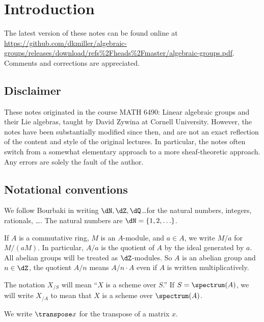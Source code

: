 
\section{Introduction}





The latest version of these notes can be found online at 
\url{https://github.com/dkmiller/algebraic-groups/releases/download/refs%2Fheads%2Fmaster/algebraic-groups.pdf}.
Comments and corrections are appreciated. 





\subsection{Disclaimer}

These notes originated in the course MATH 6490: Linear algebraic groups and 
their Lie algebras, taught by David Zywina at Cornell University. However, the 
notes have been substantially modified since then, and are not an exact 
reflection of the content and style of the original lectures. In particular, 
the notes often switch from a somewhat elementary approach to a more 
sheaf-theoretic approach. Any errors are solely the fault of the author. 





\subsection{Notational conventions}

We follow Bourbaki in writing $\dN,\dZ,\dQ$\ldots for the natural numbers, 
integers, rationals, \ldots. The natural numbers are $\dN=\{1,2,\ldots\}$. 

If $A$ is a commutative ring, $M$ is an $A$-module, and $a\in A$, 
we write $M/a$ for $M/(a M)$. In particular, $A/a$ is the quotient of $A$ by 
the ideal generated by $a$. All abelian groups will be treated as 
$\dZ$-modules. So $A$ is an abelian group and $n\in \dZ$, the quotient 
$A/n$ means $A/n\cdot A$ even if $A$ is written multiplicatively. 

The notation $X_{/S}$ will mean ``$X$ is a scheme over $S$.'' If 
$S=\spectrum(A)$, we will write $X_{/A}$ to mean that $X$ is a scheme over 
$\spectrum(A)$. 

We write $\transpose x$ for the transpose of a matrix $x$. 

